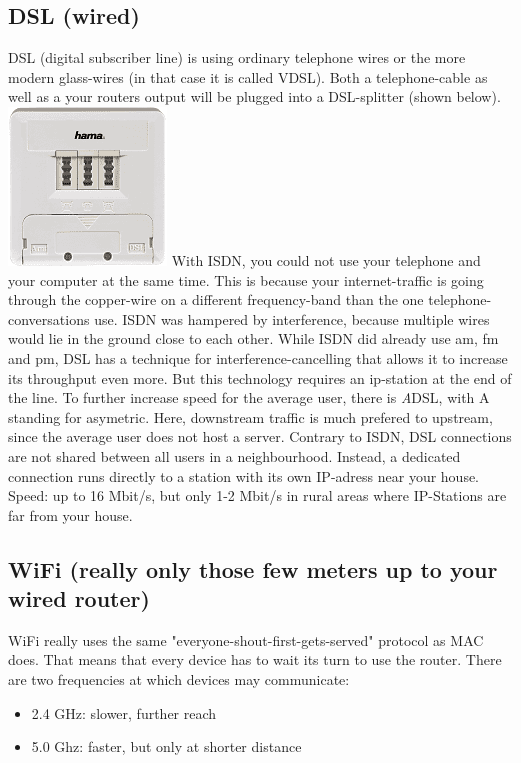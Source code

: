 \subsection{DSL (wired)}
DSL (digital subscriber line) is using ordinary telephone wires or the more modern glass-wires (in that case it is called VDSL). Both a telephone-cable as well as a your routers output will be plugged into a DSL-splitter (shown below).
\includegraphics{images/dsl_splitter.png}
With ISDN, you could not use your telephone and your computer at the same time. This is because your internet-traffic is going through the copper-wire on a different frequency-band than the one telephone-conversations use.  
ISDN was hampered by interference, because multiple wires would lie in the ground close to each other. While ISDN did already use am, fm and pm, DSL has a technique for interference-cancelling that allows it to increase its throughput even more. But this technology requires an ip-station at the end of the line. 
To further increase speed for the average user, there is \emph{A}DSL, with A standing for asymetric. Here, downstream traffic is much prefered to upstream, since the average user does not host a server.
Contrary to ISDN, DSL connections are not shared between all users in a neighbourhood. Instead, a dedicated connection runs directly to a station with its own IP-adress near your house. 
Speed: up to 16 Mbit/s, but only 1-2 Mbit/s in rural areas where IP-Stations are far from your house.


\subsection{WiFi (really only those few meters up to your wired router)}
WiFi really uses the same "everyone-shout-first-gets-served" protocol as MAC does. That means that every device has to wait its turn to use the router. 
There are two frequencies at which devices may communicate:
\begin{itemize}
    \item 2.4 GHz: slower, further reach
    \item 5.0 Ghz: faster, but only at shorter distance
\end{itemize}


